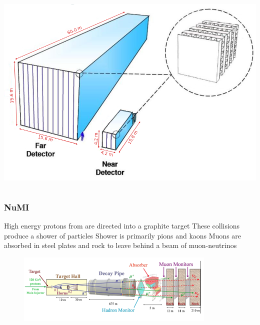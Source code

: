 \documentclass[10pt,professionalfonts,xcolor=table]{beamer}
\begin{document}
{\begin{columns}[c]
\vspace{7pt}

\includegraphics[width=1\textwidth]{figures/figures/detectors.png}

\end{columns}


}

\frame
{
  \frametitle{NuMI}
    \begin{itemize}
	\bang High energy protons from are directed into a graphite target
	\bang These collisions produce a shower of particles
	\bang Shower is primarily pions and kaons
	\bang Muons are absorbed in steel plates and rock to leave behind a beam of muon-neutrinos
	\begin{figure} \includegraphics[width=0.85\textwidth]{figures/figures/numi.png} \end{figure}
\end{itemize}

}
\end{document}
